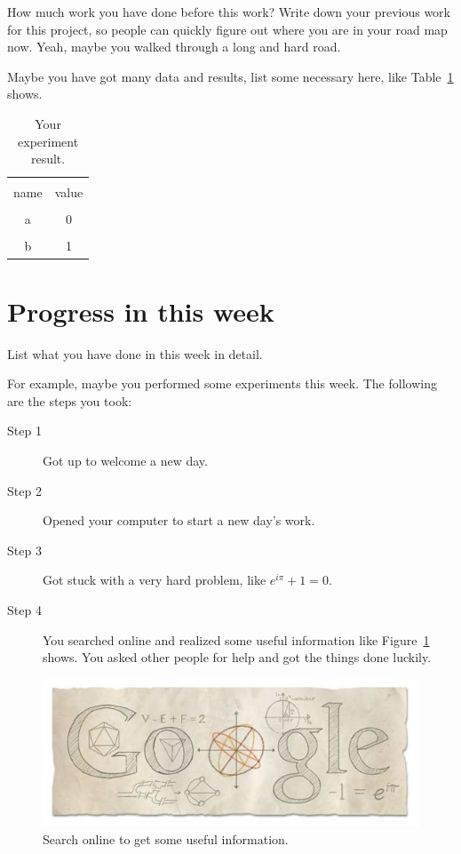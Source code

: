 \documentclass[a4paper]{article}
\begin{document}
How much work you have done before this work? Write down your previous work for this project, so people can quickly figure out where you are in your road map now. Yeah, maybe you walked through a long and hard road.

Maybe you have got many data and results, list some necessary here, like Table~\ref{tab:result} shows.

\begin{table}[hb]
    \centering
    \begin{tabular}{c|c}
        \hline \\
        name & value \\
        \hline \\
        a & 0 \\
        \hline \\
        b & 1 \\
        \hline
    \end{tabular}
    \caption{Your experiment result.}
    \label{tab:result}
\end{table}


\section{Progress in this week}

List what you have done in this week in detail.

For example, maybe you performed some experiments this week. The following are the steps you took:

\begin{description}
\item [Step 1]
Got up to welcome a new day.
\item[Step 2]
Opened your computer to start a new day's work.
\item[Step 3]
Got stuck with a very hard problem, like $e^{i \pi} + 1 = 0$.
\item[Step 4]
You searched online and realized some useful information like Figure~\ref{fig:google} shows. You asked other people for help and got the things done luckily.
\end{description}

\begin{figure}[hb]
    \centering
    \includegraphics{figures/google}
    \caption{Search online to get some useful information.}
    \label{fig:google}
\end{figure}
\end{document}
